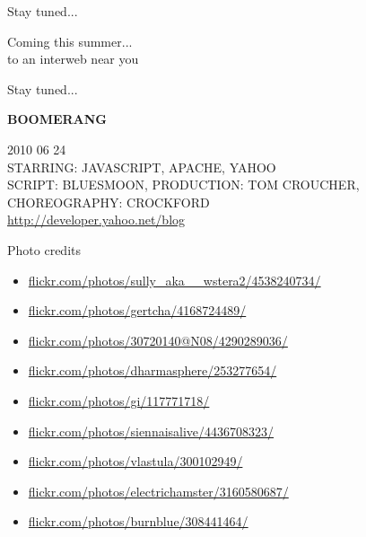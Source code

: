 \documentclass{beamer}
\begin{document}
\begin{frame}{Stay tuned...}
  \begin{center}
  Coming this summer... \\ to an interweb near you
  \end{center}
\end{frame}

\begin{frame}{Stay tuned...}
  \begin{center}
  \LARGE{\textbf{BOOMERANG}} \\
  \parbox[c][1em]{1em}{}
  \tiny{
  2010 06 24 \\
  STARRING: JAVASCRIPT, APACHE, YAHOO \\
  SCRIPT: BLUESMOON, PRODUCTION: TOM CROUCHER, CHOREOGRAPHY: CROCKFORD \\
  \href{http://developer.yahoo.net/blog/}{http://developer.yahoo.net/blog}
  }
  \end{center}
\end{frame}

\begin{frame}{Photo credits}
  \begin{itemize}
  \item \href{http://www.flickr.com/photos/sully_aka__wstera2/4538240734/}{flickr.com/photos/sully\_aka\_\_wstera2/4538240734/}
  \item \href{http://www.flickr.com/photos/gertcha/4168724489/}{flickr.com/photos/gertcha/4168724489/}
  \item \href{http://www.flickr.com/photos/30720140@N08/4290289036/}{flickr.com/photos/30720140@N08/4290289036/}
  \item \href{http://www.flickr.com/photos/dharmasphere/253277654/}{flickr.com/photos/dharmasphere/253277654/}
  \item \href{http://www.flickr.com/photos/gi/117771718/}{flickr.com/photos/gi/117771718/}
  \item \href{http://www.flickr.com/photos/siennaisalive/4436708323/}{flickr.com/photos/siennaisalive/4436708323/}
  \item \href{http://www.flickr.com/photos/vlastula/300102949/}{flickr.com/photos/vlastula/300102949/}
  \item \href{http://www.flickr.com/photos/electrichamster/3160580687/}{flickr.com/photos/electrichamster/3160580687/}
  \item \href{http://www.flickr.com/photos/burnblue/308441464/}{flickr.com/photos/burnblue/308441464/}
  \end{itemize}
\end{frame}
\end{document}
